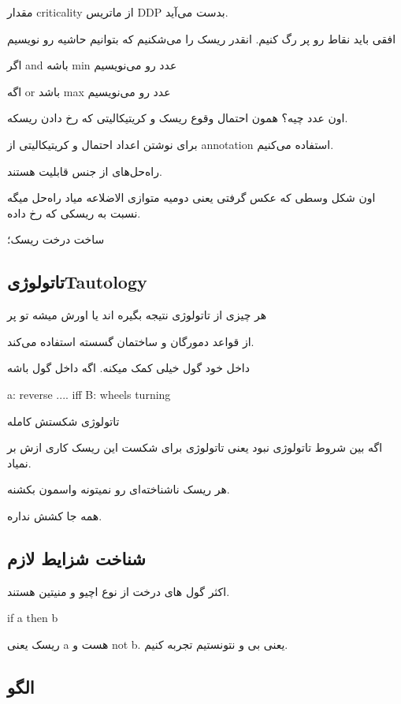 مقدار criticality از ماتریس DDP بدست می‌آید.

افقی باید نقاط رو پر رگ کنیم.
انقدر ریسک را می‌شکنیم که بتوانیم حاشیه رو نویسیم

اگر and باشه min عدد رو می‌نویسیم

اگه or باشد max عدد رو می‌نویسیم

اون عدد چیه؟ همون احتمال وقوع ریسک و کریتیکالیتی که رخ دادن ریسکه.

برای نوشتن اعداد احتمال و کریتیکالیتی از annotation استفاده می‌کنیم.

راه‌حل‌های از جنس قابلیت هستند.

اون شکل وسطی که عکس گرفتی یعنی دومیه متوازی الاضلاعه میاد راه‌حل میگه نسبت به
ریسکی که رخ داده.

ساخت درخت ریسک؛

\subsection{تاتولوژیTautology}

هر چیزی از تاتولوژی نتیجه بگیره اند یا اورش میشه تو پر

از قواعد دمورگان و ساختمان گسسته استفاده می‌کند.

داخل خود گول خیلی کمک میکنه. اگه داخل گول باشه

a: reverse .... iff B: wheels turning

تاتولوژی شکستش کامله

اگه بین شروط تاتولوژی نبود یعنی تاتولوژی برای شکست این ریسک کاری ازش بر نمیاد.

هر ریسک ناشناخته‌ای رو نمیتونه واسمون بکشنه.

همه جا کشش نداره.

\subsection{شناخت شزایط لازم}

اکثر گول ‌های درخت از نوع اچیو و منیتین هستند.

if a then b

ریسک یعنی a هست و not b. یعنی بی و نتونستیم تجربه کنیم.

\subsection{الگو}


